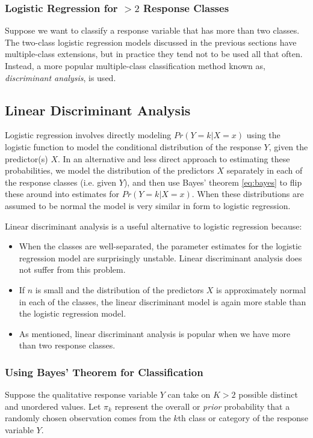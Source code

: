 \documentclass{article}
\numberwithin{equation}{section}
\begin{document}
\begin{enumerate}
\subsubsection{Logistic Regression for \texorpdfstring{$>2$}{greater than 2} Response Classes}

Suppose we want to classify a response variable that has more than two classes. The two-class logistic regression models discussed in the previous sections have multiple-class extensions, but in practice they tend not to be used all that often. Instead, a more popular multiple-class classification method known as, \textit{discriminant analysis}, is used.

\subsection{Linear Discriminant Analysis}
Logistic regression involves directly modeling $Pr(Y = k|X = x)$ using the logistic function to model the conditional distribution of the response $Y$, given the predictor(s) $X$. In an alternative and less direct approach to estimating these probabilities, we model the distribution of the predictors $X$ separately in each of the response classes (i.e. given $Y$), and then use Bayes’ theorem \eqref{eq:bayes} to flip these around into estimates for $Pr(Y = k|X = x)$. When these distributions are assumed to be normal the model is very similar in form to logistic regression.

Linear discriminant analysis is a useful alternative to logistic regression because:
\begin{itemize}
    \item When the classes are well-separated, the parameter estimates for the logistic regression model are surprisingly unstable. Linear discriminant analysis does not suffer from this problem.
    \item If $n$ is small and the distribution of the predictors $X$ is approximately normal in each of the classes, the linear discriminant model is again more stable than the logistic regression model.
    \item As mentioned, linear discriminant analysis is popular when we have more than two response classes.
\end{itemize}

\subsubsection{Using Bayes’ Theorem for Classification}
Suppose the qualitative response variable $Y$ can take on $K>2$ possible distinct and unordered values. Let $\pi_k$ represent the overall or \textit{prior} probability that a randomly chosen observation comes from the $k$th class or category of the response variable $Y$.


\end{enumerate}
\end{document}
